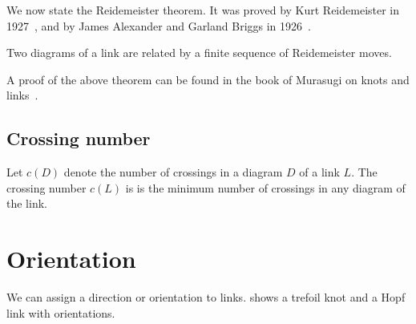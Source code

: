 We now state the Reidemeister theorem. It was proved by Kurt Reidemeister in 1927~\cite{reidemeister}, and by James Alexander and Garland Briggs in 1926~\cite{alexanderbriggs}.

\begin{thm}[Reidemeister]
    Two diagrams of a link are related by a finite sequence of Reidemeister moves.
\end{thm}

A proof of the above theorem can be found in the book of Murasugi on knots and links~\cite[chp.~4]{murasugi}.

\subsection{Crossing number}

Let \(c(D)\) denote the number of crossings in a diagram \(D\) of a link \(L\). The crossing number \(c(L)\) is is the minimum number of crossings in any diagram of the link.

\section{Orientation}

We can assign a direction or orientation to links.  shows a trefoil knot and a Hopf link with orientations.

